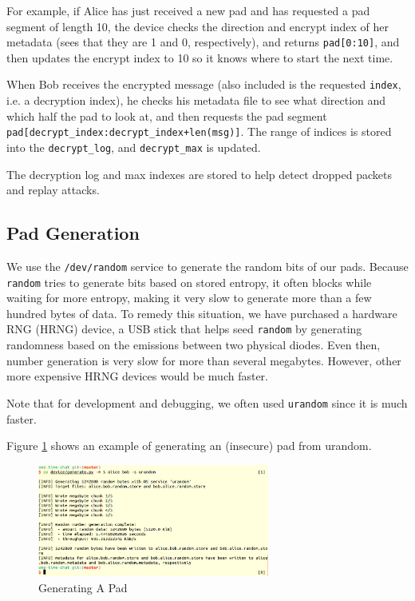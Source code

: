 \documentclass[twocolumn]{article}
\begin{document}
For example, if Alice has just received a new pad and has requested a pad segment of length 10, the device checks the direction and encrypt index of her metadata (sees that they are 1 and 0, respectively), and returns \texttt{pad[0:10]}, and then updates the encrypt index to 10 so it knows where to start the next time.

When Bob receives the encrypted message (also included is the requested \texttt{index}, i.e. a decryption index), he checks his metadata file to see what direction and which half the pad to look at, and then requests the pad segment \texttt{pad[decrypt\_index:decrypt\_index+len(msg)]}. The range of indices is stored into the \texttt{decrypt\_log}, and \texttt{decrypt\_max} is updated.

The decryption log and max indexes are stored to help detect dropped packets and replay attacks.

\subsection{Pad Generation}
\label{sec:padgen}
We use the \texttt{/dev/random} service to generate the random bits of our pads. Because \texttt{random} tries to generate bits based on stored entropy, it often blocks while waiting for more entropy, making it very slow to generate more than a few hundred bytes of data. To remedy this situation, we have purchased a hardware RNG (HRNG) device, a USB stick that helps seed \texttt{random} by generating randomness based on the emissions between two physical diodes. Even then, number generation is very slow for more than several megabytes. However, other more expensive HRNG devices would be much faster.

Note that for development and debugging, we often used \texttt{urandom} since it is much faster.

Figure \ref{fig:genpad} shows an example of generating an (insecure) pad from urandom.

\begin{figure}[htp]
\centering
\includegraphics[width=3in]{generate}
\caption{Generating A Pad}
\label{fig:genpad}
\end{figure}
\end{document}
